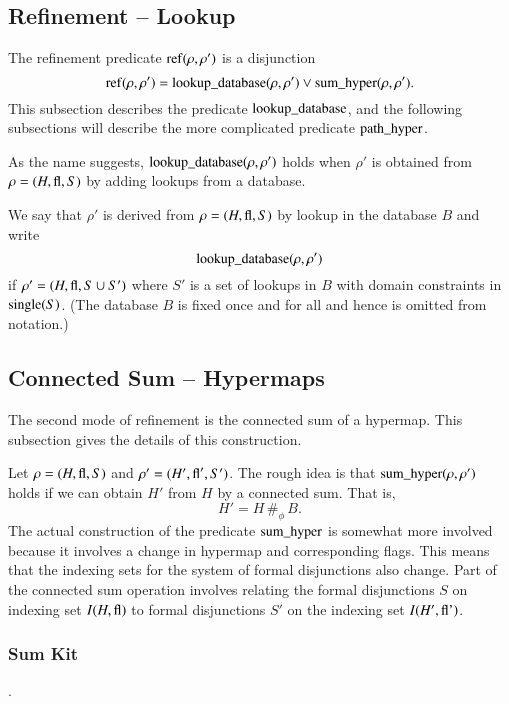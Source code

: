 \subsection{Refinement -- Lookup}
%
\label{sec:refine}

The refinement predicate ${\operatorname{ref}}(\rho,\rho')$ is a disjunction
    \begin{equation}
    {\operatorname{ref}}(\rho,\rho') =
    {\operatorname{lookup\_database}}(\rho,\rho')\vee
    {\operatorname{sum\_hyper}}(\rho,\rho').
    \end{equation}
This subsection describes the predicate ${\operatorname{lookup\_database}}$,
and the following subsections  will describe the more complicated
predicate ${\operatorname{path\_hyper}}$.

As the name suggests, ${\operatorname{lookup\_database}}(\rho,\rho')$ holds
when $\rho'$ is obtained from $\rho=(H,{\operatorname{fl}},S)$ by adding
lookups from a database.

\begin{definition}
We say that $\rho'$ is derived from $\rho=(H,{\operatorname{fl}},S)$ by lookup
in the database $B$ and write
    $${\operatorname{lookup\_database}}(\rho,\rho')$$
if $\rho' = (H,{\operatorname{fl}},S \cup S')$ where $S'$ is a set of lookups
in $B$ with domain constraints in ${\operatorname{single}}(S)$. (The database
$B$ is fixed once and for all and hence is omitted from notation.)
\end{definition}

\subsection{Connected Sum -- Hypermaps}

The second mode of refinement is the connected sum of a hypermap.  This
subsection gives the details of this construction.

Let $\rho=(H,{\operatorname{fl}},S)$ and $\rho'=(H',{\operatorname{fl}}',S')$.   The rough
idea is that ${\operatorname{sum\_hyper}}(\rho,\rho')$ holds if we can
obtain $H'$ from $H$ by a connected sum. That is,
    $$H' = H\,\#_\phi\, B.
    $$
The actual
construction of the predicate ${\operatorname{sum\_hyper}}$ is somewhat more
involved because it involves a change in hypermap and
corresponding flags. This means that the indexing sets for the
system of formal disjunctions also change.  Part of the connected sum
operation involves relating the formal disjunctions $S$ on
indexing set $I(H,{\operatorname{fl}})$ to formal disjunctions $S'$ on the
indexing set $I(H',{\operatorname{fl'}})$.

\subsubsection{Sum Kit}.


